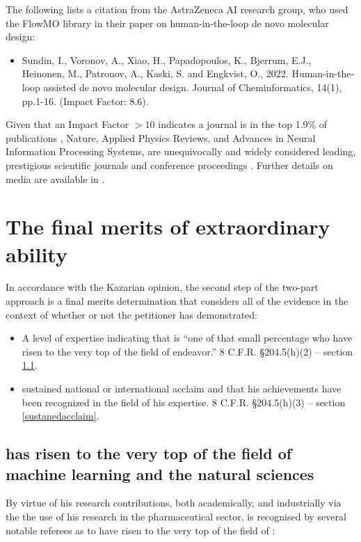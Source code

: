 \documentclass[11pt]{article}
\begin{document}
The following lists a citation from the AstraZeneca AI research group, who used the FlowMO library in their paper on human-in-the-loop de novo molecular design:

\begin{itemize}
    \item Sundin, I., Voronov, A., Xiao, H., Papadopoulos, K., Bjerrum, E.J., Heinonen, M., Patronov, A., Kaski, S. and Engkvist, O., 2022. Human-in-the-loop assisted de novo molecular design. Journal of Cheminformatics, 14(1), pp.1-16. (Impact Factor: 8.6).
\end{itemize}

Given that an Impact Factor $> 10$ indicates a journal is in the top 1.9\% of publications \cite{impact_factor}, Nature, Applied Physics Reviews, and Advances in Neural Information Processing Systems, are unequivocally and widely considered leading, prestigious scientific journals and conference proceedings \cite{topcitations}. Further details on media are available in \cite{media}.


\section{The final merits of \drs extraordinary ability}

In accordance with the Kazarian opinion, the second step of the two-part approach is a final merits determination that considers all of the evidence in the context of whether or not the petitioner has demonstrated:
\begin{itemize}
 \item A level of expertise indicating that \dr is “one of that small percentage who have risen to the very top of the field of endeavor.” 8 C.F.R. §204.5(h)(2) -- section \ref{risentotop}.
 \item \drs sustained national or international acclaim and that his achievements have been recognized in the field of his expertise. 8 C.F.R. §204.5(h)(3) -- section \ref{sustanedacclaim}.
\end{itemize}

\subsection{\dr has risen to the very top of the field of machine learning and the natural sciences}
\label{risentotop}

By virtue of his research contributions, both academically, and industrially via the the use of his research in the pharmaceutical sector, \dr is recognised by several notable referees as to have risen to the very top of the field of \fie{}: \\
\end{document}
